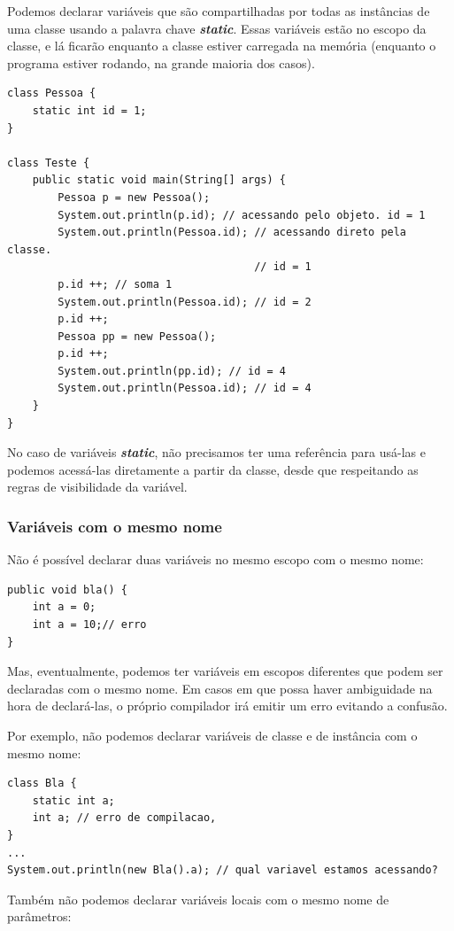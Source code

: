 \documentclass[12pt]{article}
\begin{document}
Podemos declarar variáveis que são compartilhadas por todas as instâncias de uma classe usando a palavra chave \textbf{\textit{static}}. Essas variáveis estão no escopo da classe, e lá ficarão enquanto a classe estiver carregada na memória (enquanto o programa estiver rodando, na grande maioria dos casos).

\begin{lstlisting}
class Pessoa {
	static int id = 1;
}
	
class Teste {
	public static void main(String[] args) {
		Pessoa p = new Pessoa();
		System.out.println(p.id); // acessando pelo objeto. id = 1
		System.out.println(Pessoa.id); // acessando direto pela classe.
		                               // id = 1
		p.id ++; // soma 1
		System.out.println(Pessoa.id); // id = 2
		p.id ++;
		Pessoa pp = new Pessoa(); 
		p.id ++;
		System.out.println(pp.id); // id = 4
		System.out.println(Pessoa.id); // id = 4
	}
}
\end{lstlisting}

No caso de variáveis \textbf{\textit{static}}, não precisamos ter uma referência para usá-las e podemos acessá-las diretamente a partir da classe, desde que respeitando as regras de visibilidade da variável.

\subsubsection{Variáveis com o mesmo nome}

Não é possível declarar duas variáveis no mesmo escopo com o mesmo nome:

\begin{lstlisting}
public void bla() {
	int a = 0;
	int a = 10;// erro
}
\end{lstlisting}

Mas, eventualmente, podemos ter variáveis em escopos diferentes que podem ser declaradas com o mesmo nome. Em casos em que possa haver ambiguidade na hora de declará-las, o próprio compilador irá emitir um erro evitando a confusão.

Por exemplo, não podemos declarar variáveis de classe e de instância com o mesmo nome:

\begin{lstlisting}
class Bla {
	static int a;
	int a; // erro de compilacao,
}
...
System.out.println(new Bla().a); // qual variavel estamos acessando?
\end{lstlisting}

Também não podemos declarar variáveis locais com o mesmo nome de parâmetros:
\end{document}
